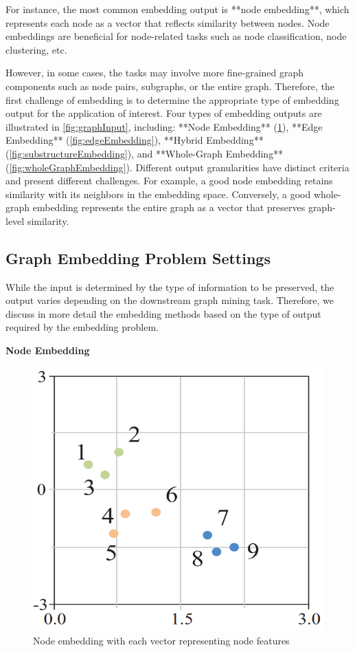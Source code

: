 For instance, the most common embedding output is **node embedding**, which represents each node as a vector that reflects similarity between nodes. Node embeddings are beneficial for node-related tasks such as node classification, node clustering, etc.

However, in some cases, the tasks may involve more fine-grained graph components such as node pairs, subgraphs, or the entire graph. Therefore, the first challenge of embedding is to determine the appropriate type of embedding output for the application of interest. Four types of embedding outputs are illustrated in \autoref{fig:graphInput}, including: **Node Embedding** (\ref{fig:nodeEmbedding}), **Edge Embedding** (\ref{fig:edgeEmbedding}), **Hybrid Embedding** (\ref{fig:substructureEmbedding}), and **Whole-Graph Embedding** (\ref{fig:wholeGraphEmbedding}). Different output granularities have distinct criteria and present different challenges. For example, a good node embedding retains similarity with its neighbors in the embedding space. Conversely, a good whole-graph embedding represents the entire graph as a vector that preserves graph-level similarity.

\subsection{Graph Embedding Problem Settings}

While the input is determined by the type of information to be preserved, the output varies depending on the downstream graph mining task. Therefore, we discuss in more detail the embedding methods based on the type of output required by the embedding problem.

\textbf{Node Embedding}
\label{sec:nodeEmbedding}

\begin{figure}[htp]
	\centering
	\includegraphics[width=7 cm]{images/graph_emb_2.png}
	\caption{
		Node embedding with each vector representing node features}
	\label{fig:nodeEmbedding}
\end{figure}

